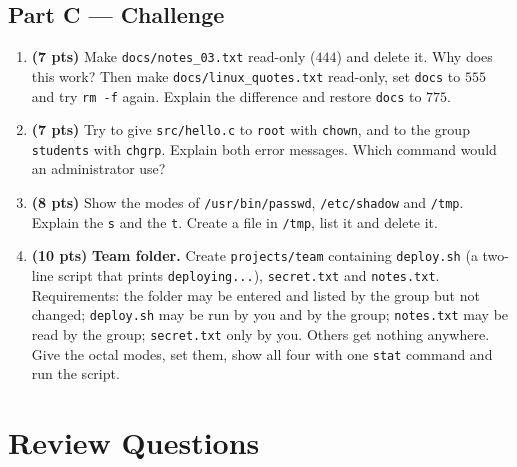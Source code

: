 \documentclass[11pt,a4paper]{article}
\newcommand{\cmd}[1]{\texttt{#1}}
\begin{document}
\subsection*{Part C --- Challenge}
\begin{enumerate}[leftmargin=1.8em,label=\textbf{\arabic*.},resume]
  \item \textbf{(7 pts)} Make \texttt{docs/notes\_03.txt} read-only ($444$) and delete it. Why does this work? Then make \texttt{docs/linux\_quotes.txt} read-only, set \texttt{docs} to $555$ and try \cmd{rm -f} again. Explain the difference and restore \texttt{docs} to $775$.
  \item \textbf{(7 pts)} Try to give \texttt{src/hello.c} to \texttt{root} with \cmd{chown}, and to the group \texttt{students} with \cmd{chgrp}. Explain both error messages. Which command would an administrator use?
  \item \textbf{(8 pts)} Show the modes of \texttt{/usr/bin/passwd}, \texttt{/etc/shadow} and \texttt{/tmp}. Explain the \texttt{s} and the \texttt{t}. Create a file in \texttt{/tmp}, list it and delete it.
  \item \textbf{(10 pts)} \textbf{Team folder.} Create \texttt{projects/team} containing \texttt{deploy.sh} (a two-line script that prints \texttt{deploying...}), \texttt{secret.txt} and \texttt{notes.txt}. Requirements: the folder may be entered and listed by the group but not changed; \texttt{deploy.sh} may be run by you and by the group; \texttt{notes.txt} may be read by the group; \texttt{secret.txt} only by you. Others get nothing anywhere. Give the octal modes, set them, show all four with one \cmd{stat} command and run the script.
\end{enumerate}

\section{Review Questions}
\end{document}
